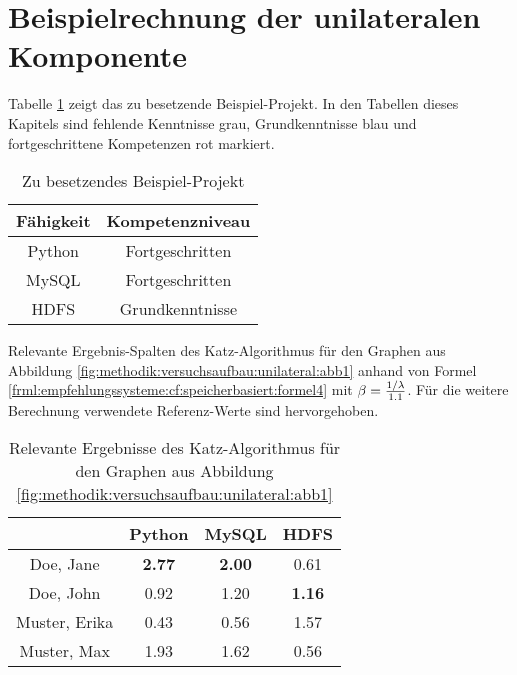\section{Beispielrechnung der unilateralen Komponente}
\label{ch:nebenrechnungen:unilateral}
Tabelle \ref{tbl:berechnungDerKatzZentralitaetPseudoMitarbeiter:tbl1} zeigt das zu besetzende Beispiel-Projekt. In den Tabellen dieses Kapitels sind fehlende Kenntnisse grau, Grundkenntnisse blau und fortgeschrittene Kompetenzen rot markiert.
\begin{table}[h]
	\centering
	\begin{tabular}{c|c}
		Fähigkeit & Kompetenzniveau \\
		\hline
		Python  & \cellcolor{usercolor}Fortgeschritten\\
		MySQL   & \cellcolor{usercolor}Fortgeschritten\\
		HDFS    & \cellcolor{itemcolor}Grundkenntnisse
	\end{tabular}
	\caption{Zu besetzendes Beispiel-Projekt}
	\label{tbl:berechnungDerKatzZentralitaetPseudoMitarbeiter:tbl1}
\end{table}

Relevante Ergebnis-Spalten des Katz-Algorithmus für den Graphen aus Abbildung \ref{fig:methodik:versuchsaufbau:unilateral:abb1} anhand von Formel \ref{frml:empfehlungssysteme:cf:speicherbasiert:formel4} mit $\beta = \frac{1/\lambda}{1.1}$. Für die weitere Berechnung verwendete Referenz-Werte sind hervorgehoben.

\begin{table}[h]
	\centering
	\begin{tabular}{c|c|c|c}
		& Python & MySQL & HDFS\\ 
		\hline
		Doe, Jane     & \cellcolor{usercolor}\textbf{2.77} & \cellcolor{itemcolor}\textbf{2.00} & \cellcolor{exxetagray}0.61\\
		Doe, John     & \cellcolor{exxetagray}0.92 & \cellcolor{itemcolor}1.20 & \cellcolor{itemcolor}\textbf{1.16}\\
		Muster, Erika & \cellcolor{exxetagray}0.43 & \cellcolor{exxetagray}0.56 & \cellcolor{usercolor}1.57\\
		Muster, Max   & \cellcolor{itemcolor}1.93 & \cellcolor{itemcolor}1.62 & \cellcolor{exxetagray}0.56
	\end{tabular}
	\caption{Relevante Ergebnisse des Katz-Algorithmus für den Graphen aus Abbildung \ref{fig:methodik:versuchsaufbau:unilateral:abb1}}
	\label{tbl:berechnungDerKatzZentralitaetPseudoMitarbeiter:tbl2}
\end{table}

